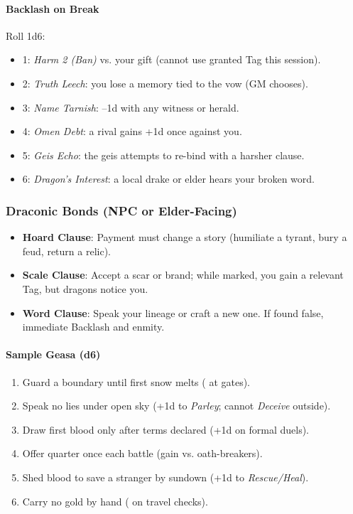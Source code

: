 \documentclass[11pt,letterpaper]{article}
\begin{document}
\paragraph{Backlash on Break}
Roll 1d6:
\begin{itemize}[leftmargin=*]
\item 1: \textit{Harm 2 (Ban)} vs. your gift (cannot use granted Tag this session).
\item 2: \textit{Truth Leech}: you lose a memory tied to the vow (GM chooses).
\item 3: \textit{Name Tarnish}: --1d with any witness or herald.
\item 4: \textit{Omen Debt}: a rival gains +1d once against you.
\item 5: \textit{Geis Echo}: the geis attempts to re-bind with a harsher clause.
\item 6: \textit{Dragon's Interest}: a local drake or elder hears your broken word.
\end{itemize}

\subsubsection{Draconic Bonds (NPC or Elder-Facing)}
\begin{itemize}[leftmargin=*]
\item \textbf{Hoard Clause}: Payment must change a story (humiliate a tyrant, bury a feud, return a relic).
\item \textbf{Scale Clause}: Accept a scar or brand; while marked, you gain a relevant Tag, but dragons notice you.
\item \textbf{Word Clause}: Speak your lineage or craft a new one. If found false, immediate Backlash and enmity.
\end{itemize}

\paragraph{Sample Geasa (d6)}
\begin{enumerate}[leftmargin=*]
\item Guard a boundary until first snow melts ( at gates).
\item Speak no lies under open sky (+1d to \textit{Parley}; cannot \textit{Deceive} outside).
\item Draw first blood only after terms declared (+1d on formal duels).
\item Offer quarter once each battle (gain  vs. oath-breakers).
\item Shed blood to save a stranger by sundown (+1d to \textit{Rescue/Heal}).
\item Carry no gold by hand ( on travel checks).
\end{enumerate}
\end{document}
